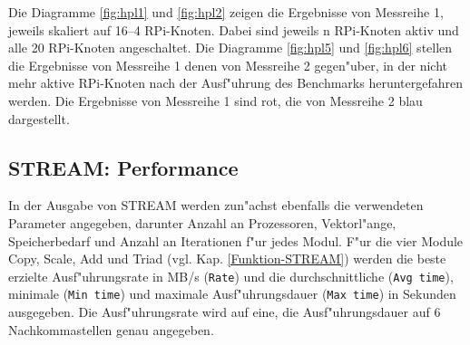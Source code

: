 Die Diagramme \ref{fig:hpl1} und \ref{fig:hpl2} zeigen die Ergebnisse von Messreihe 1, jeweils skaliert auf 16--4 RPi-Knoten. Dabei sind jeweils n RPi-Knoten aktiv und alle 20 RPi-Knoten angeschaltet.
\noindent
Die Diagramme \ref{fig:hpl5} und \ref{fig:hpl6} stellen die Ergebnisse von Messreihe 1 denen von Messreihe 2 gegen"uber, in der nicht mehr aktive RPi-Knoten nach der Ausf"uhrung des Benchmarks heruntergefahren werden. Die Ergebnisse von Messreihe 1 sind rot, die von Messreihe 2 blau dargestellt.

\subsection{STREAM: Performance}\label{Ergebnisse-STREAM}

In der Ausgabe von STREAM werden zun"achst ebenfalls die verwendeten Parameter angegeben, darunter Anzahl an Prozessoren, Vektorl"ange, Speicherbedarf und Anzahl an Iterationen f"ur jedes Modul. F"ur die vier Module Copy, Scale, Add und Triad (vgl. Kap. \ref{Funktion-STREAM}) werden die beste erzielte Ausf"uhrungsrate in MB/s (\texttt{Rate}) und die durchschnittliche (\texttt{Avg time}), minimale (\texttt{Min time}) und maximale Ausf"uhrungsdauer (\texttt{Max time}) in Sekunden ausgegeben. Die Ausf"uhrungsrate wird auf eine, die Ausf"uhrungsdauer auf 6 Nachkommastellen genau angegeben. 

